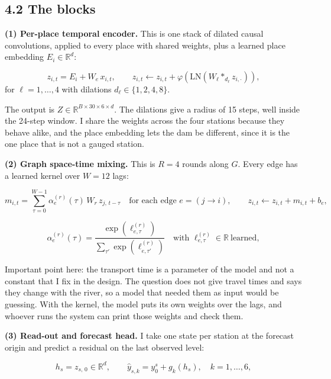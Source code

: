 \documentclass[11pt,letterpaper]{article}
\begin{document}
\subsection*{4.2 The blocks}

\textbf{(1) Per-place temporal encoder.} This is one stack of dilated causal
convolutions, applied to every place with shared weights, plus a learned place
embedding $E_i\in\mathbb{R}^d$:

\begin{equation*}
z_{i,t} = E_i + W_e\, x_{i,t}, \qquad
z_{i,t} \leftarrow z_{i,t} + \varphi\!\left(\mathrm{LN}\!\left(W_\ell \ast_{d_\ell} z_{i,\cdot}\right)\right),
\end{equation*}
for $\ell=1,\dots,4$ with dilations $d_\ell \in \{1,2,4,8\}$.

The output is $Z\in\mathbb{R}^{B\times30\times6\times d}$. The dilations give a
radius of 15 steps, well inside the 24-step window. I share the weights across the
four stations because they behave alike, and the place embedding lets the dam be
different, since it is the one place that is not a gauged station.

\textbf{(2) Graph space-time mixing.} This is $R=4$ rounds along $G$. Every edge
has a learned kernel over $W=12$ lags:

\begin{equation*}
m_{i,t} = \sum_{\tau=0}^{W-1} \alpha^{(r)}_e(\tau)\, W_r\, z_{j,\,t-\tau}
\quad\text{for each edge } e=(j\to i), \qquad
z_{i,t} \leftarrow z_{i,t} + m_{i,t} + b_e ,
\end{equation*}

\begin{equation*}
\alpha^{(r)}_e(\tau) = \frac{\exp(\ell^{(r)}_{e,\tau})}{\sum_{\tau'}\exp(\ell^{(r)}_{e,\tau'})}
\quad\text{with } \ell^{(r)}_{e,\tau}\in\mathbb{R}\ \text{learned},
\end{equation*}

Important point here: the transport time is a parameter
of the model and not a constant that I fix in the design. The question does not
give travel times and says they change with the river, so a model that needed them
as input would be guessing. With the kernel, the model puts its own weights over
the lags, and whoever runs the system can print those weights and check them.

\textbf{(3) Read-out and forecast head.} I take one state per station at the
forecast origin and predict a residual on the last observed level:

\begin{equation*}
h_s = z_{s,\,0}\in\mathbb{R}^{d}, \qquad
\hat y_{s,k} = y^s_0 + g_k(h_s), \quad k=1,\dots,6,
\end{equation*}
\end{document}

